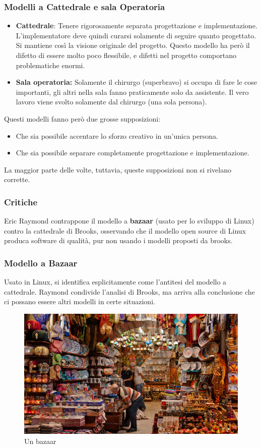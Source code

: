 \documentclass[a4paper,12pt]{article}
\begin{document}
\subsubsection{Modelli a Cattedrale e sala Operatoria}
\begin{itemize}
\item \textbf{Cattedrale}: Tenere rigorosamente separata progettazione e implementazione. L'implementatore deve quindi curarsi solamente di seguire quanto progettato. Si mantiene così la visione originale del progetto. Questo modello ha però il difetto di essere molto poco flessibile, e difetti nel progetto comportano problematiche enormi.
\item \textbf{Sala operatoria:} Solamente il chirurgo (superbravo) si occupa di fare le cose importanti, gli altri nella sala fanno praticamente solo da assistente. Il vero lavoro viene svolto solamente dal chirurgo (una sola persona).
\end{itemize}
Questi modelli fanno però due grosse supposizioni:
\begin{itemize}
\item Che sia possibile accentare lo sforzo creativo in un'unica persona.
\item Che sia possibile separare completamente progettazione e implementazione.
\end{itemize}
La maggior parte delle volte, tuttavia, queste supposizioni non si rivelano corrette.

\subsubsection{Critiche}
Eric Raymond contrappone il modello a \textbf{bazaar} (usato per lo sviluppo di Linux) contro la cattedrale di Brooks, osservando che il modello open source di Linux produca software di qualità, pur non usando i modelli proposti da brooks.

\subsubsection{Modello a Bazaar}
Usato in Linux, si identifica esplicitamente come l'antitesi del modello a cattedrale. Raymond condivide l'analisi di Brooks, ma arriva alla conclusione che ci possano essere altri modelli in certe situazioni.

\begin{figure}[H]
	\centering
	 \includegraphics[width=0.6\linewidth]{Immagini/bazaar.jpg}
	 \caption{Un bazaar}
\end{figure}
\end{document}
